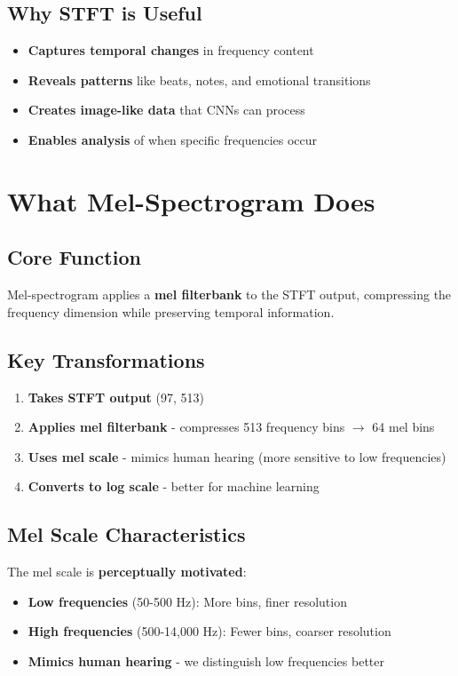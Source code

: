 \documentclass[12pt]{article}
\begin{document}
\subsection{Why STFT is Useful}
\begin{itemize}
    \item \textbf{Captures temporal changes} in frequency content
    \item \textbf{Reveals patterns} like beats, notes, and emotional transitions
    \item \textbf{Creates image-like data} that CNNs can process
    \item \textbf{Enables analysis} of when specific frequencies occur
\end{itemize}

\section{What Mel-Spectrogram Does}

\subsection{Core Function}
Mel-spectrogram applies a \textbf{mel filterbank} to the STFT output, compressing the frequency dimension while preserving temporal information.

\subsection{Key Transformations}
\begin{enumerate}
    \item \textbf{Takes STFT output} (97, 513)
    \item \textbf{Applies mel filterbank} - compresses 513 frequency bins $\rightarrow$ 64 mel bins
    \item \textbf{Uses mel scale} - mimics human hearing (more sensitive to low frequencies)
    \item \textbf{Converts to log scale} - better for machine learning
\end{enumerate}

\subsection{Mel Scale Characteristics}
The mel scale is \textbf{perceptually motivated}:
\begin{itemize}
    \item \textbf{Low frequencies} (50-500 Hz): More bins, finer resolution
    \item \textbf{High frequencies} (500-14,000 Hz): Fewer bins, coarser resolution
    \item \textbf{Mimics human hearing} - we distinguish low frequencies better
\end{itemize}
\end{document}
